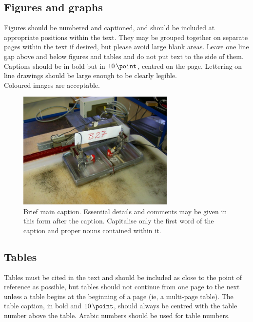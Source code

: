 \documentclass[12pt, a4paper]{article}
\begin{document}
\subsection{Figures and graphs}
Figures should be numbered and captioned, and should be included at appropriate positions within the text. They may be grouped together on separate pages within the text if desired, but please avoid large blank areas. Leave one line gap above and below figures and tables and do not put text to the side of them. Captions should be in bold but in \(\SI{10}{\point}\), centred on the page. Lettering on line drawings should be large enough to be clearly legible.\\

Coloured images are acceptable.
\begin{figure}[H]
  \centering
  \includegraphics[height=5.84cm, width=7.78cm]{./figures/example-figure}
  \caption{Brief main caption. Essential details and comments may be given in this form after the caption. Capitalise only the first word of the caption and proper nouns contained within it.}\label{fig:my_label}
\end{figure}

\subsection{Tables}
Tables must be cited in the text and should be included as close to the point of reference as possible, but tables should not continue from one page to the next unless a table begins at the beginning of a page (ie, a multi-page table). The table caption, in bold and \(\SI{10}{\point}\), should always be centred with the table number above the table. Arabic numbers should be used for table numbers.
\end{document}
